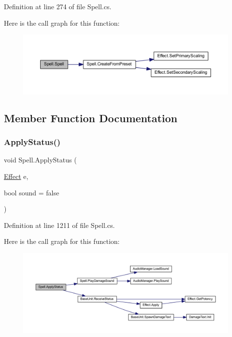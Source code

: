 Definition at line 274 of file Spell.\+cs.

Here is the call graph for this function\+:
\nopagebreak
\begin{figure}[H]
\begin{center}
\leavevmode
\includegraphics[width=350pt]{class_spell_a555a02d92d6de53a3b6d39bfda11c2cc_cgraph}
\end{center}
\end{figure}


\subsection{Member Function Documentation}
\mbox{\label{class_spell_aa020942716a6504fc6b23351a4baa3b6}} 
\subsubsection{\texorpdfstring{ApplyStatus()}{ApplyStatus()}}
{\footnotesize\ttfamily void Spell.\+Apply\+Status (\begin{DoxyParamCaption}\item[{\mbox{\hyperlink{class_effect}{Effect}}}]{e,  }\item[{bool}]{sound = {\ttfamily false} }\end{DoxyParamCaption})}



Definition at line 1211 of file Spell.\+cs.

Here is the call graph for this function\+:
\nopagebreak
\begin{figure}[H]
\begin{center}
\leavevmode
\includegraphics[width=350pt]{class_spell_aa020942716a6504fc6b23351a4baa3b6_cgraph}
\end{center}
\end{figure}
\mbox{\label{class_spell_a89146285dc4dadf46398da2683bcc869}} 

